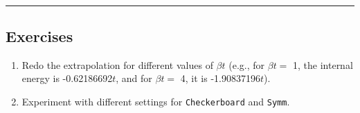     \begin{center}
    \end{center}
    { \hspace*{\fill} \\}
    
    \begin{center}\rule{0.5\linewidth}{\linethickness}\end{center}

\hypertarget{exercises}{%
\subsection{Exercises}\label{exercises}}

\begin{enumerate}
\def\labelenumi{\arabic{enumi}.}
\tightlist
\item
  Redo the extrapolation for different values of \(\beta t\) (e.g., for
  \(\beta t =\) 1, the internal energy is -0.62186692\(t\), and for
  \(\beta t =\) 4, it is -1.90837196\(t\)).
\item
  Experiment with different settings for \texttt{Checkerboard} and
  \texttt{Symm}.
\end{enumerate}


    
    
    
